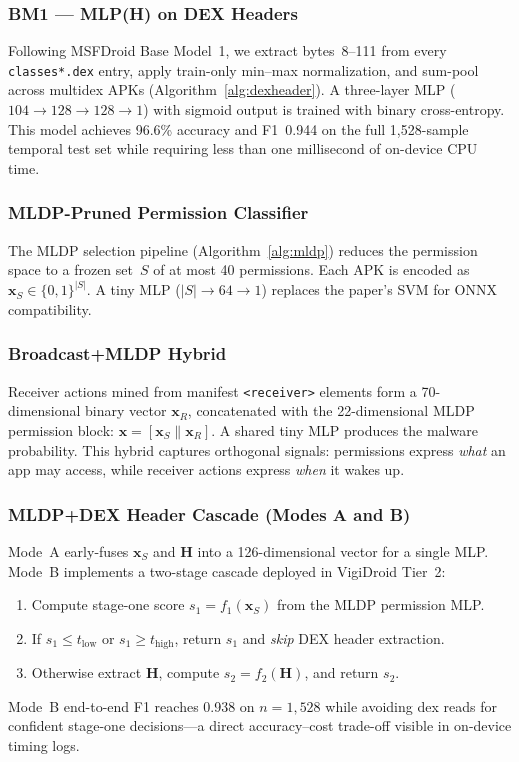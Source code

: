\subsubsection{BM1 --- MLP(H) on DEX Headers}
Following MSFDroid Base Model~1, we extract bytes~8--111 from every \texttt{classes*.dex} entry, apply train-only min--max normalization, and sum-pool across multidex APKs (Algorithm~\ref{alg:dexheader}). A three-layer MLP ($104 \rightarrow 128 \rightarrow 128 \rightarrow 1$) with sigmoid output is trained with binary cross-entropy. This model achieves 96.6\% accuracy and F1~0.944 on the full 1,528-sample temporal test set while requiring less than one millisecond of on-device CPU time.

\subsubsection{MLDP-Pruned Permission Classifier}
The MLDP selection pipeline (Algorithm~\ref{alg:mldp}) reduces the permission space to a frozen set~$S$ of at most 40 permissions. Each APK is encoded as $\mathbf{x}_S \in \{0,1\}^{|S|}$. A tiny MLP ($|S| \rightarrow 64 \rightarrow 1$) replaces the paper's SVM for ONNX compatibility.

\subsubsection{Broadcast+MLDP Hybrid}
Receiver actions mined from manifest \texttt{<receiver>} elements form a 70-dimensional binary vector $\mathbf{x}_R$, concatenated with the 22-dimensional MLDP permission block: $\mathbf{x} = [\mathbf{x}_S \| \mathbf{x}_R]$. A shared tiny MLP produces the malware probability. This hybrid captures orthogonal signals: permissions express \emph{what} an app may access, while receiver actions express \emph{when} it wakes up.

\subsubsection{MLDP+DEX Header Cascade (Modes A and B)}
Mode~A early-fuses $\mathbf{x}_S$ and $\mathbf{H}$ into a 126-dimensional vector for a single MLP. Mode~B implements a two-stage cascade deployed in VigiDroid Tier~2:
\begin{enumerate}
 \item Compute stage-one score $s_1 = f_1(\mathbf{x}_S)$ from the MLDP permission MLP.
 \item If $s_1 \leq t_{\mathrm{low}}$ or $s_1 \geq t_{\mathrm{high}}$, return $s_1$ and \emph{skip} DEX header extraction.
 \item Otherwise extract $\mathbf{H}$, compute $s_2 = f_2(\mathbf{H})$, and return $s_2$.
\end{enumerate}
Mode~B end-to-end F1 reaches 0.938 on $n{=}1{,}528$ while avoiding dex reads for confident stage-one decisions---a direct accuracy--cost trade-off visible in on-device timing logs.

